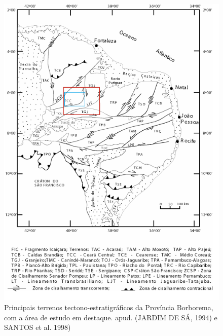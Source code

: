 \begin{figure}
\centering
\includegraphics[width=1.0\linewidth]{Figs/borboreema}
\caption{Principais terrenos tectono-estratigráficos da Província Borborema, com a área de estudo em destaque. \citep{naoki2007} apud. (JARDIM DE SÁ, 1994) e SANTOS et al. 1998)}
\label{fig:borboreema}
\end{figure}









